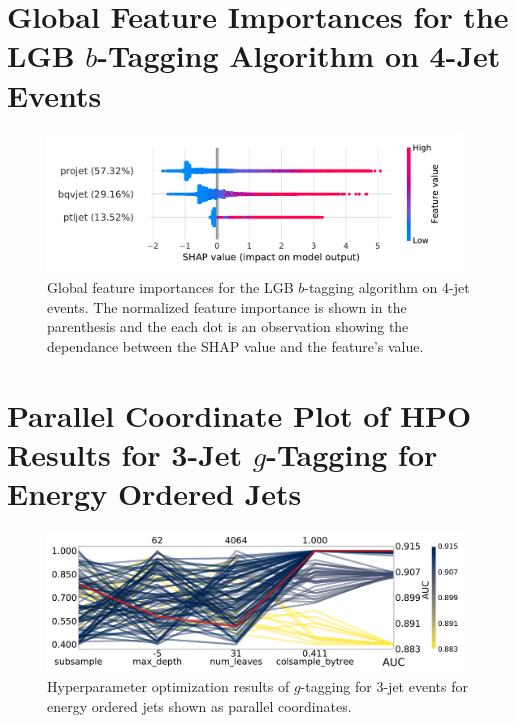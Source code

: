 \section[Global Feature Importances for the LGB b-Tagging Algorithm on 4-Jet Events]{Global Feature Importances for the LGB $b$-Tagging Algorithm on 4-Jet Events}
\begin{figure}[h!]
  \includegraphics[width=0.98\textwidth, trim=10 10 20 10, clip]{figures/quarks/shap_global-down_sample=1.00-ML_vars=vertex-selection=b-ejet_min=4-n_iter_RS_lgb=99-n_iter_RS_xgb=9-cdot_cut=0.90-version=19-njet=4.pdf}
  \caption[Global Feature Importances for the LGB $b$-Tagging Algorithm on 4-Jet Events]
          {Global feature importances for the LGB $b$-tagging algorithm on 4-jet events. The normalized feature importance is shown in the parenthesis and the each dot is an observation showing the dependance between the SHAP value and the feature's value. 
          } 
\end{figure}
\clearpage


\FloatBarrier
\section[Parallel Coordinate Plot of HPO Results for 3-Jet g-Tagging for Energy Ordered Jets]{Parallel Coordinate Plot of HPO Results for 3-Jet $g$-Tagging for Energy Ordered Jets}
\begin{figure}[h!]
  \includegraphics[width=0.98\textwidth, trim=0 0 0 0, clip]{figures/quarks/CV_viz-njet=3-name=lf_gtag_energy_ordered_lgb_down_sample=1.00-ML_vars=vertex-selection=b-ejet_min=4-n_iter_RS_lgb=99-n_iter_RS_xgb=9-cdot_cut=0.90-version=19.pdf}
  \caption[Parallel Coordinate Plot of HPO Results for 3-Jet $g$-Tagging for Energy Ordered Jets]
          {Hyperparameter optimization results of $g$-tagging for 3-jet events for energy ordered jets shown as parallel coordinates. 
          } 
  \label{fig:q:CV_res_parallel_coords_g_tag_3j_energy_ordered}
\end{figure}
\vspace{3cm}
